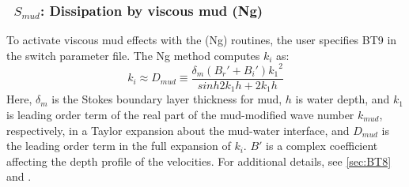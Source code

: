 \vsssub
\subsubsection{~$S_{mud}$: Dissipation by viscous mud (Ng)} \label{sec:BT9}
\vsssub


\noindent

To activate viscous mud effects with the (Ng) routines, the user specifies {\code BT9} in the switch parameter file. The Ng method computes $k_i$ as:
\begin{equation}\label{eq:dmud3}
  k_i \approx {D_{mud}} \equiv \frac{\delta_m({B_r'}+{B_i'}){k_1}^2}{sinh2{k_1}{h}+2{k_1}{h}}
\end{equation}
Here, ${\delta_m}$ is the Stokes boundary layer thickness for mud, ${h}$ is water depth, 
and ${k_1}$ is leading order term of the real part of the mud-modified wave number $k_{mud}$, respectively, in a Taylor expansion about the mud-water interface, and ${D_{mud}}$ is the leading order term in the full expansion of $k_i$. $B'$ is a complex coefficient affecting the
depth profile of the velocities.  For additional details, see \ref{sec:BT8} and \cite{art:Ng00}. 
